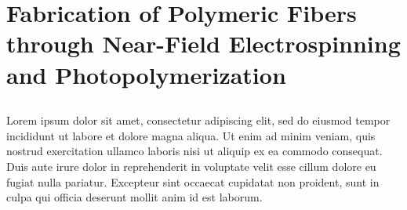
\chapter{Fabrication of Polymeric Fibers through Near-Field Electrospinning and Photopolymerization} %

\label{Chapter:5}

\section{}

Lorem ipsum dolor sit amet, consectetur adipiscing elit, sed do eiusmod tempor incididunt ut labore et dolore magna aliqua. Ut enim ad minim veniam, quis nostrud exercitation ullamco laboris nisi ut aliquip ex ea commodo consequat. Duis aute irure dolor in reprehenderit in voluptate velit esse cillum dolore eu fugiat nulla pariatur. Excepteur sint occaecat cupidatat non proident, sunt in culpa qui officia deserunt mollit anim id est laborum.